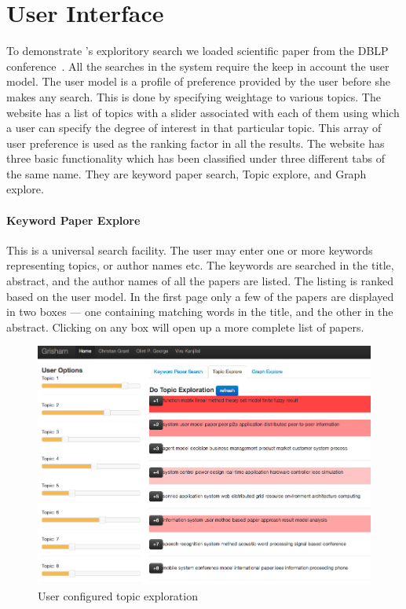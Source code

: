 
\section{User Interface}
\label{sec:demo}


To demonstrate \system's exploritory search we loaded scientific paper from the DBLP conference~\cite{Tang:2008:EMA:1367497.1367722}.
All the searches in the system require the keep in account the user model.
The user model is a profile of preference provided by the user before she makes any search.
This is done by specifying weightage to various topics.
The \system website has a list of topics with a slider associated with each of them using which a user can specify the degree of interest in that particular topic.
This array of user preference is used as the ranking factor in all the results.
The website has three basic functionality which has been classified under three different tabs of the same name.
They are keyword paper search, Topic explore, and Graph explore. 

\paragraph{Keyword Paper Explore}
This is a universal search facility.
The user may enter one or more keywords representing topics, or author names etc.
The keywords are searched in the title, abstract, and the author names of all the papers are listed.
The listing is ranked based on the user model.
In the first page only a few of the papers are displayed in two boxes --- one containing matching words in the title, and the other in the abstract.
Clicking on any box will open up a more complete list of papers.

\begin{figure}[htb]
\includegraphics[width=.5\textwidth]{images/topic_exploration.png} %
\caption{User configured topic exploration}
\label{fig:topic_exploration}
\end{figure}

